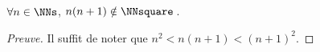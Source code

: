 \begin{fact} \label{case-2}
	 $\forall n \in \NNs$, $n(n+1) \notin \NNsquare$\,.
\end{fact}




\begin{proof}[Preuve]
	Il suffit de noter que $n^2 < n(n+1) < (n+1)^2$.
\end{proof}
